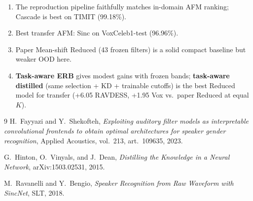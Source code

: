 \documentclass[11pt,a4paper]{article}
\begin{document}
\begin{enumerate}[leftmargin=1.6em,itemsep=0.3em]
  \item The reproduction pipeline faithfully matches in-domain AFM ranking; Cascade is best on TIMIT (99.18\%).
  \item Best transfer AFM: Sinc on VoxCeleb1-test (96.96\%).
  \item Paper Mean-shift Reduced (43 frozen filters) is a solid compact baseline but weaker OOD here.
  \item \textbf{Task-aware ERB} gives modest gains with frozen bands; \textbf{task-aware distilled} (same selection + KD + trainable cutoffs) is the best Reduced model for transfer (+6.05 RAVDESS, +1.95 Vox vs.\ paper Reduced at equal $K$).
\end{enumerate}

\begin{thebibliography}{9}
H.~Fayyazi and Y.~Shekofteh,
\textit{Exploiting auditory filter models as interpretable convolutional frontends to obtain optimal architectures for speaker gender recognition},
Applied Acoustics, vol.~213, art.~109635, 2023.

G.~Hinton, O.~Vinyals, and J.~Dean,
\textit{Distilling the Knowledge in a Neural Network},
arXiv:1503.02531, 2015.

M.~Ravanelli and Y.~Bengio,
\textit{Speaker Recognition from Raw Waveform with SincNet},
SLT, 2018.
\end{thebibliography}
\end{document}
